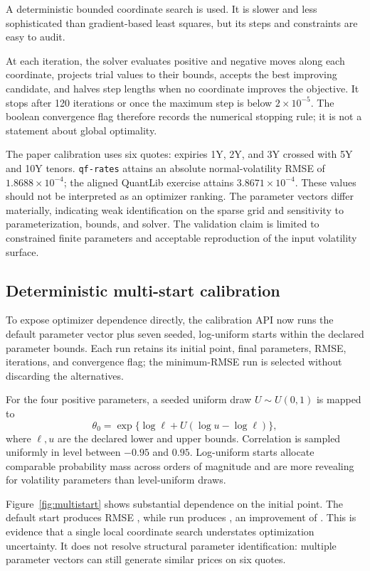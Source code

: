 \documentclass[11pt]{article}
\numberwithin{equation}{section}
\theoremstyle{definition}
\theoremstyle{remark}
\begin{document}
A deterministic bounded coordinate search is used. It is slower and less
sophisticated than gradient-based least squares, but its steps and constraints
are easy to audit.

At each iteration, the solver evaluates positive and negative moves along each
coordinate, projects trial values to their bounds, accepts the best improving
candidate, and halves step lengths when no coordinate improves the objective.
It stops after 120 iterations or once the maximum step is below
$2\times10^{-5}$. The boolean convergence flag therefore records the numerical
stopping rule; it is not a statement about global optimality.

The paper calibration uses six quotes: expiries 1Y, 2Y, and 3Y crossed with 5Y
and 10Y tenors. \texttt{qf-rates} attains an absolute normal-volatility RMSE of
$1.8688\times10^{-4}$; the aligned QuantLib exercise attains
$3.8671\times10^{-4}$. These values should not be interpreted as an optimizer
ranking. The parameter vectors differ materially, indicating weak identification
on the sparse grid and sensitivity to parameterization, bounds, and solver. The
validation claim is limited to constrained finite parameters and acceptable
reproduction of the input volatility surface.

\subsection{Deterministic multi-start calibration}

To expose optimizer dependence directly, the calibration API now runs the
default parameter vector plus seven seeded, log-uniform starts within the
declared parameter bounds. Each run retains its initial point, final parameters,
RMSE, iterations, and convergence flag; the minimum-RMSE run is selected without
discarding the alternatives.

For the four positive parameters, a seeded uniform draw $U\sim U(0,1)$ is
mapped to
\begin{equation}
  \theta_0=\exp\{\log \ell+U(\log u-\log \ell)\},
\end{equation}
where $\ell,u$ are the declared lower and upper bounds. Correlation is sampled
uniformly in level between $-0.95$ and $0.95$. Log-uniform starts allocate
comparable probability mass across orders of magnitude and are more revealing
for volatility parameters than level-uniform draws.

Figure~\ref{fig:multistart} shows substantial dependence on the initial point.
The default start produces RMSE \MultiStartDefaultRMSE{}, while run
\MultiStartBestRun{} produces \MultiStartBestRMSE{}, an improvement of
\MultiStartImprovement{}. This is evidence that a single local coordinate
search understates optimization uncertainty. It does not resolve structural
parameter identification: multiple parameter vectors can still generate similar
prices on six quotes.
\end{document}
